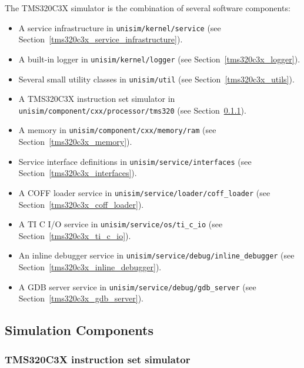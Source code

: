 The TMS320C3X simulator is the combination of several software components:
\begin{itemize}
\item A service infrastructure in \texttt{unisim/kernel/service} (see Section~\ref{tms320c3x_service_infrastructure}).
\item A built-in logger in \texttt{unisim/kernel/logger} (see Section~\ref{tms320c3x_logger}).
\item Several small utility classes in \texttt{unisim/util} (see Section~\ref{tms320c3x_utils}).
\item A TMS320C3X instruction set simulator in \texttt{unisim/component/cxx/processor/tms320} (see Section~\ref{tms320c3x_iss}).
\item A memory in \texttt{unisim/component/cxx/memory/ram} (see Section~\ref{tms320c3x_memory}).
\item Service interface definitions in \texttt{unisim/service/interfaces} (see Section~\ref{tms320c3x_interfaces}).
\item A COFF loader service in \texttt{unisim/service/loader/coff\_loader} (see Section~\ref{tms320c3x_coff_loader}).
\item A TI C I/O service in \texttt{unisim/service/os/ti\_c\_io} (see Section~\ref{tms320c3x_ti_c_io}).
\item An inline debugger service in \texttt{unisim/service/debug/inline\_debugger} (see Section~\ref{tms320c3x_inline_debugger}).
\item A GDB server service in \texttt{unisim/service/debug/gdb\_server} (see Section~\ref{tms320c3x_gdb_server}).
\end{itemize}

\subsection{Simulation Components}

\subsubsection{TMS320C3X instruction set simulator}
\label{tms320c3x_iss}


